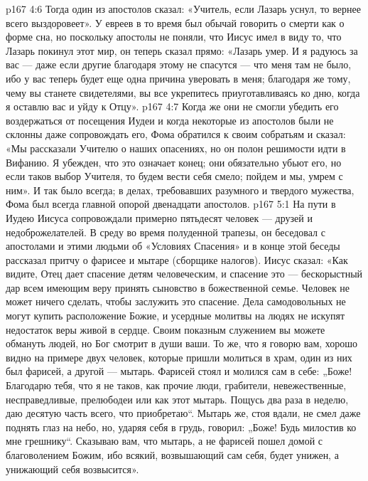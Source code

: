 \vs p167 4:6 Тогда один из апостолов сказал: «Учитель, если Лазарь уснул, то вернее всего выздоровеет». У евреев в то время был обычай говорить о смерти как о форме сна, но поскольку апостолы не поняли, что Иисус имел в виду то, что Лазарь покинул этот мир, он теперь сказал прямо: «Лазарь умер. И я радуюсь за вас --- даже если другие благодаря этому не спасутся --- что меня там не было, ибо у вас теперь будет еще одна причина уверовать в меня; благодаря же тому, чему вы станете свидетелями, вы все укрепитесь приуготавливаясь ко дню, когда я оставлю вас и уйду к Отцу».
\vs p167 4:7 Когда же они не смогли убедить его воздержаться от посещения Иудеи и когда некоторые из апостолов были не склонны даже сопровождать его, Фома обратился к своим собратьям и сказал: «Мы рассказали Учителю о наших опасениях, но он полон решимости идти в Вифанию. Я убежден, что это означает конец; они обязательно убьют его, но если таков выбор Учителя, то будем вести себя смело; пойдем и мы, умрем с ним». И так было всегда; в делах, требовавших разумного и твердого мужества, Фома был всегда главной опорой двенадцати апостолов.
\vs p167 5:1 На пути в Иудею Иисуса сопровождали примерно пятьдесят человек --- друзей и недоброжелателей. В среду во время полуденной трапезы, он беседовал с апостолами и этими людьми об «Условиях Спасения» и в конце этой беседы рассказал притчу о фарисее и мытаре (сборщике налогов). Иисус сказал: «Как видите, Отец дает спасение детям человеческим, и спасение это --- бескорыстный дар всем имеющим веру принять сыновство в божественной семье. Человек не может ничего сделать, чтобы заслужить это спасение. Дела самодовольных не могут купить расположение Божие, и усердные молитвы на людях не искупят недостаток веры живой в сердце. Своим показным служением вы можете обмануть людей, но Бог смотрит в души ваши. То же, что я говорю вам, хорошо видно на примере двух человек, которые пришли молиться в храм, один из них был фарисей, а другой --- мытарь. Фарисей стоял и молился сам в себе: „Боже! Благодарю тебя, что я не таков, как прочие люди, грабители, невежественные, несправедливые, прелюбодеи или как этот мытарь. Пощусь два раза в неделю, даю десятую часть всего, что приобретаю“. Мытарь же, стоя вдали, не смел даже поднять глаз на небо, но, ударяя себя в грудь, говорил: „Боже! Будь милостив ко мне грешнику“. Сказываю вам, что мытарь, а не фарисей пошел домой с благоволением Божим, ибо всякий, возвышающий сам себя, будет унижен, а унижающий себя возвысится».
